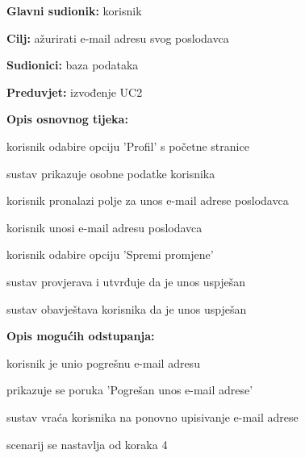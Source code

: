 					\noindent {}
					\begin{packed_item}
	
						\item \textbf{Glavni sudionik: }korisnik
						\item  \textbf{Cilj:} ažurirati e-mail adresu svog poslodavca
						\item  \textbf{Sudionici:} baza podataka
						\item  \textbf{Preduvjet:} izvođenje UC2
						\item  \textbf{Opis osnovnog tijeka:}
						
						\item[] \begin{packed_enum}
	
							\item korisnik odabire opciju 'Profil' s početne stranice
							\item sustav prikazuje osobne podatke korisnika 
							\item korisnik pronalazi polje za unos e-mail adrese poslodavca
							\item korisnik unosi e-mail adresu poslodavca
							\item korisnik odabire opciju 'Spremi promjene'
							\item sustav provjerava i utvrđuje da je unos uspješan
							\item sustav obavještava korisnika da je unos uspješan
			
						\end{packed_enum}
						
						\item  \textbf{Opis mogućih odstupanja:}
						
						\item[] \begin{packed_item}
							\item[6.a] korisnik je unio pogrešnu e-mail adresu 
							\item[] 
							\begin{packed_enum} 
								\item prikazuje se poruka 'Pogrešan unos e-mail adrese'
								\item sustav vraća korisnika na ponovno upisivanje e-mail adrese
								\item scenarij se nastavlja od koraka 4
								
							\end{packed_enum}
						\end{packed_item}
						
					\end{packed_item}

